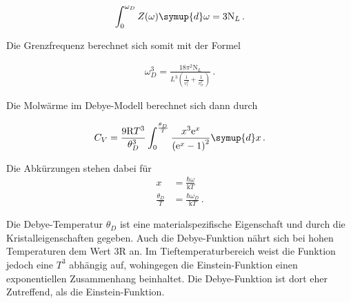 \begin{align*}
  \int_0^{\omega_D} Z(\omega) \symup{d} \omega = 3 \text{N}_L \, .
\end{align*}

Die Grenzfrequenz berechnet sich somit mit der Formel

\begin{align*}
  \omega_D^3 = \frac{18 \pi^2 \text{N}_L}{L^3 \left(\frac{1}{v_l^3} + \frac{1}{v_{tr}^3} \right)} \, .
\end{align*}

Die Molwärme im Debye-Modell berechnet sich dann durch

\begin{equation}
  C_V = \frac{9 \text{R} T^3}{\theta_D^3} \int_0^{\frac{\theta_D}{T}}
  \frac{x^3 \mathrm{e}^x} {\left(\mathrm{e}^x -1 \right)^2} \symup{d} x \, .
\end{equation}

Die Abkürzungen stehen dabei für
\begin{align*}
  x &= \frac{\hbar \omega}{\text{k} T} \\
  \frac{\theta_D}{T} &= \frac{\hbar \omega_D}{\text{k} T} \, .
\end{align*}

Die Debye-Temperatur $\theta_D$ ist eine materialspezifische Eigenschaft und
durch die Kristalleigenschaften gegeben. Auch die Debye-Funktion nährt sich
bei hohen Temperaturen dem Wert $3 \text{R}$ an. Im Tieftemperaturbereich
weist die Funktion jedoch eine $T^3$ abhängig auf, wohingegen die
Einstein-Funktion einen exponentiellen Zusammenhang beinhaltet. Die
Debye-Funktion ist dort eher Zutreffend, als die Einstein-Funktion.

